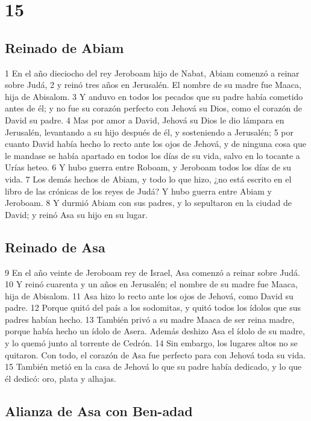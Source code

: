 \chapter{15}

\section*{Reinado de Abiam}

1 En el año dieciocho del rey Jeroboam hijo de Nabat, Abiam comenzó a reinar sobre Judá, 
2 y reinó tres años en Jerusalén. El nombre de su madre fue Maaca, hija de Abisalom.
3 Y anduvo en todos los pecados que su padre había cometido antes de él; y no fue su corazón perfecto con Jehová su Dios, como el corazón de David su padre.
4 Mas por amor a David, Jehová su Dios le dio lámpara en Jerusalén, levantando a su hijo después de él, y sosteniendo a Jerusalén;
5 por cuanto David había hecho lo recto ante los ojos de Jehová, y de ninguna cosa que le mandase se había apartado en todos los días de su vida, salvo en lo tocante a Urías heteo. 
6 Y hubo guerra entre Roboam, y Jeroboam todos los días de su vida. 
7 Los demás hechos de Abiam, y todo lo que hizo, ¿no está escrito en el libro de las crónicas de los reyes de Judá? Y hubo guerra entre Abiam y Jeroboam.
8 Y durmió Abiam con sus padres, y lo sepultaron en la ciudad de David; y reinó Asa su hijo en su lugar.

\section*{Reinado de Asa}

9 En el año veinte de Jeroboam rey de Israel, Asa comenzó a reinar sobre Judá.
10 Y reinó cuarenta y un años en Jerusalén; el nombre de su madre fue Maaca, hija de Abisalom.
11 Asa hizo lo recto ante los ojos de Jehová, como David su padre.
12 Porque quitó del país a los sodomitas, y quitó todos los ídolos que sus padres habían hecho. 
13 También privó a su madre Maaca de ser reina madre, porque había hecho un ídolo de Asera. Además deshizo Asa el ídolo de su madre, y lo quemó junto al torrente de Cedrón.
14 Sin embargo, los lugares altos no se quitaron. Con todo, el corazón de Asa fue perfecto para con Jehová toda su vida.
15 También metió en la casa de Jehová lo que su padre había dedicado, y lo que él dedicó: oro, plata y alhajas. 

\section*{Alianza de Asa con Ben-adad}


